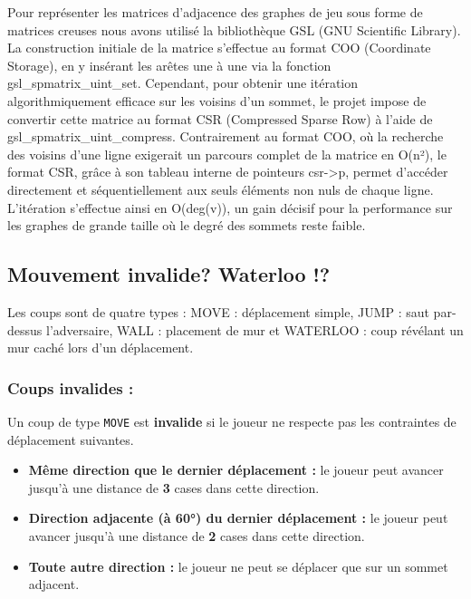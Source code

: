 \documentclass[12pt,a4paper]{article}
\begin{document}
Pour représenter les matrices d'adjacence des graphes de jeu sous forme de matrices creuses nous avons utilisé la bibliothèque GSL (GNU Scientific Library). La construction initiale de la matrice s'effectue au format COO (Coordinate Storage), en y insérant les arêtes une à une via la fonction gsl\_spmatrix\_uint\_set. Cependant, pour obtenir une itération algorithmiquement efficace sur les voisins d'un sommet, le projet impose de convertir cette matrice au format CSR (Compressed Sparse Row) à l'aide de gsl\_spmatrix\_uint\_compress. Contrairement au format COO, où la recherche des voisins d'une ligne exigerait un parcours complet de la matrice en O(n²), le format CSR, grâce à son tableau interne de pointeurs csr->p, permet d'accéder directement et séquentiellement aux seuls éléments non nuls de chaque ligne. L'itération s'effectue ainsi en O(deg(v)), un gain décisif pour la performance sur les graphes de grande taille où le degré des sommets reste faible. 


\subsection{Mouvement invalide? Waterloo !?}

Les coups sont de quatre types : MOVE : déplacement simple, JUMP : saut par-dessus l'adversaire, WALL : placement de mur et WATERLOO : coup révélant un mur caché lors d'un déplacement.

\subsubsection*{Coups invalides :}

Un coup de type \texttt{MOVE} est \textbf{invalide} si le joueur ne respecte pas 
les contraintes de déplacement suivantes.

\begin{itemize}
    \item \textbf{Même direction que le dernier déplacement :} le joueur peut 
    avancer jusqu'à une distance de \textbf{3} cases dans cette direction.
    
    \item \textbf{Direction adjacente (à 60°) du dernier déplacement :} le joueur 
    peut avancer jusqu'à une distance de \textbf{2} cases dans cette direction.
    
    \item \textbf{Toute autre direction :} le joueur ne peut se déplacer que sur 
    un sommet adjacent.
\end{itemize}
\end{document}
